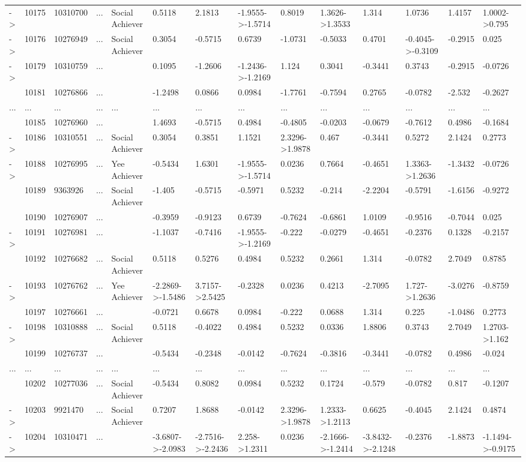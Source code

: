\documentclass[6pt,a4paper]{article}
\begin{document}
\begin{landscape}
{\begin{longtable}{llllllllllllll}
-\textgreater &10175&10310700&...&Social Achiever&0.5118&2.1813&-1.9555-\textgreater -1.5714&0.8019&1.3626-\textgreater 1.3533&1.314&1.0736&1.4157&1.0002-\textgreater 0.795\tabularnewline
-\textgreater &10176&10276949&...&Social Achiever&0.3054&-0.5715&0.6739&-1.0731&-0.5033&0.4701&-0.4045-\textgreater -0.3109&-0.2915&0.025\tabularnewline
-\textgreater &10179&10310759&...&&0.1095&-1.2606&-1.2436-\textgreater -1.2169&1.124&0.3041&-0.3441&0.3743&-0.2915&-0.0726\tabularnewline
&10181&10276866&...&&-1.2498&0.0866&0.0984&-1.7761&-0.7594&0.2765&-0.0782&-2.532&-0.2627\tabularnewline
...&...&...&...&...&...&...&...&...&...&...&...&...&...\tabularnewline
&10185&10276960&...&&1.4693&-0.5715&0.4984&-0.4805&-0.0203&-0.0679&-0.7612&0.4986&-0.1684\tabularnewline
-\textgreater &10186&10310551&...&Social Achiever&0.3054&0.3851&1.1521&2.3296-\textgreater 1.9878&0.467&-0.3441&0.5272&2.1424&0.2773\tabularnewline
-\textgreater &10188&10276995&...&Yee Achiever&-0.5434&1.6301&-1.9555-\textgreater -1.5714&0.0236&0.7664&-0.4651&1.3363-\textgreater 1.2636&-1.3432&-0.0726\tabularnewline
&10189&9363926&...&Social Achiever&-1.405&-0.5715&-0.5971&0.5232&-0.214&-2.2204&-0.5791&-1.6156&-0.9272\tabularnewline
&10190&10276907&...&&-0.3959&-0.9123&0.6739&-0.7624&-0.6861&1.0109&-0.9516&-0.7044&0.025\tabularnewline
-\textgreater &10191&10276981&...&&-1.1037&-0.7416&-1.9555-\textgreater -1.2169&-0.222&-0.0279&-0.4651&-0.2376&0.1328&-0.2157\tabularnewline
&10192&10276682&...&Social Achiever&0.5118&0.5276&0.4984&0.5232&0.2661&1.314&-0.0782&2.7049&0.8785\tabularnewline
-\textgreater &10193&10276762&...&Yee Achiever&-2.2869-\textgreater -1.5486&3.7157-\textgreater 2.5425&-0.2328&0.0236&0.4213&-2.7095&1.727-\textgreater 1.2636&-3.0276&-0.8759\tabularnewline
&10197&10276661&...&&-0.0721&0.6678&0.0984&-0.222&0.0688&1.314&0.225&-1.0486&0.2773\tabularnewline
-\textgreater &10198&10310888&...&Social Achiever&0.5118&-0.4022&0.4984&0.5232&0.0336&1.8806&0.3743&2.7049&1.2703-\textgreater 1.162\tabularnewline
&10199&10276737&...&&-0.5434&-0.2348&-0.0142&-0.7624&-0.3816&-0.3441&-0.0782&0.4986&-0.024\tabularnewline
...&...&...&...&...&...&...&...&...&...&...&...&...&...\tabularnewline
&10202&10277036&...&Social Achiever&-0.5434&0.8082&0.0984&0.5232&0.1724&-0.579&-0.0782&0.817&-0.1207\tabularnewline
-\textgreater &10203&9921470&...&Social Achiever&0.7207&1.8688&-0.0142&2.3296-\textgreater 1.9878&1.2333-\textgreater 1.2113&0.6625&-0.4045&2.1424&0.4874\tabularnewline
-\textgreater &10204&10310471&...&&-3.6807-\textgreater -2.0983&-2.7516-\textgreater -2.2436&2.258-\textgreater 1.2311&0.0236&-2.1666-\textgreater -1.2414&-3.8432-\textgreater -2.1248&-0.2376&-1.8873&-1.1494-\textgreater -0.9175\tabularnewline

\end{longtable}}
\end{landscape}
\end{document}
